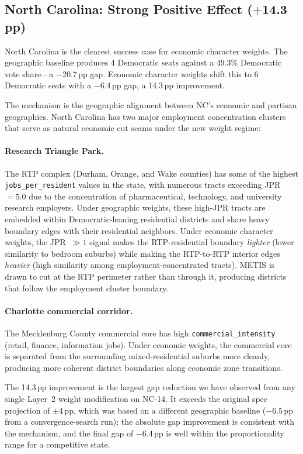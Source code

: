 \subsection{North Carolina: Strong Positive Effect ($+$14.3\,pp)}

North Carolina is the clearest success case for economic character weights.
The geographic baseline produces 4 Democratic seats against a 49.3\% Democratic
vote share---a $-$20.7\,pp gap.
Economic character weights shift this to 6 Democratic seats with a $-$6.4\,pp gap,
a 14.3\,pp improvement.

The mechanism is the geographic alignment between NC's economic and partisan
geographies.
North Carolina has two major employment concentration clusters that serve as
natural economic cut seams under the new weight regime:

\paragraph{Research Triangle Park.}
The RTP complex (Durham, Orange, and Wake counties) has some of the highest
\texttt{jobs\_per\_resident} values in the state, with numerous tracts
exceeding JPR~$= 5.0$ due to the concentration of pharmaceutical,
technology, and university research employers.
Under geographic weights, these high-JPR tracts are embedded within
Democratic-leaning residential districts and share heavy boundary edges
with their residential neighbors.
Under economic character weights, the JPR~$\gg 1$ signal makes the
RTP-residential boundary \emph{lighter} (lower similarity to bedroom suburbs)
while making the RTP-to-RTP interior edges \emph{heavier} (high similarity
among employment-concentrated tracts).
METIS is drawn to cut at the RTP perimeter rather than through it, producing
districts that follow the employment cluster boundary.

\paragraph{Charlotte commercial corridor.}
The Mecklenburg County commercial core has high \texttt{commercial\_intensity}
(retail, finance, information jobs).
Under economic weights, the commercial core is separated from the surrounding
mixed-residential suburbs more cleanly, producing more coherent district
boundaries along economic zone transitions.

The 14.3\,pp improvement is the largest gap reduction we have observed from
any single Layer~2 weight modification on NC-14.
It exceeds the original spec projection of $\pm 4$\,pp, which was based on a
different geographic baseline ($-6.5$\,pp from a convergence-search run);
the absolute gap improvement is consistent with the mechanism, and the final
gap of $-6.4$\,pp is well within the proportionality range for a competitive
state.

